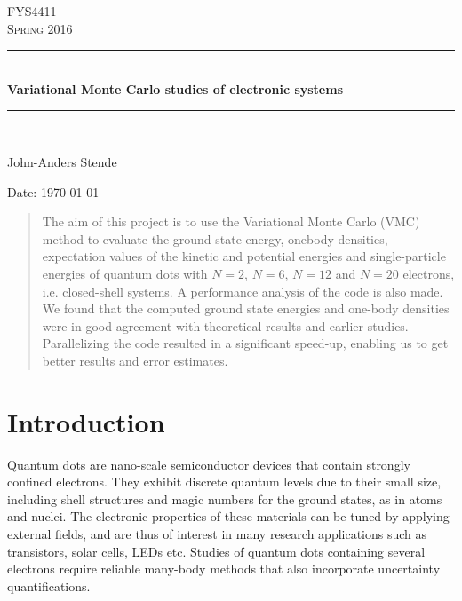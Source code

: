 \documentclass[english, a4paper]{article}
\begin{document}
\renewcommand{\figurename}{Figure}
\begin{titlepage}
\begin{center}

\textsc{\Large FYS4411}\\[0.5cm]
\textsc{\Large Spring 2016}\\[1.5cm]
\rule{\linewidth}{0.5mm} \\[0.4cm]
{ \huge \bfseries Variational Monte Carlo studies of electronic systems}\\[0.10cm]
\rule{\linewidth}{0.5mm} \\[1.5cm]

\begin{minipage}{0.49\textwidth}
    \begin{center} \large
        John-Anders Stende \\[0.8cm]
    \end{center}
\end{minipage}


\vfill

\large{Date: \today}

\end{center}
\end{titlepage}


\begin{abstract}
The aim of this project is to use the Variational Monte Carlo (VMC) method to evaluate the
ground state energy, onebody densities, expectation values of the kinetic and potential energies
and single-particle energies of quantum dots with $N=2$, $N=6$, $N=12$ and $N=20$ electrons,
i.e. closed-shell systems. A performance analysis of the code is also made. \\

\noindent
We found that the computed ground state energies and one-body densities were in good agreement 
with theoretical results
and earlier studies. Parallelizing the code resulted in a significant speed-up, enabling us to 
get better results and error estimates. 


\end{abstract}

\tableofcontents


\section{Introduction}
\noindent Quantum dots are nano-scale semiconductor devices that contain strongly confined electrons. 
They exhibit discrete quantum levels due to their small size, including shell structures and magic
numbers for the ground states, as in atoms and nuclei. The electronic properties of these materials 
can be tuned by applying external fields, and are thus of interest in many research applications such as
transistors, solar cells, LEDs etc. Studies of quantum dots containing several electrons require
reliable many-body methods that also incorporate uncertainty quantifications.\\
\end{document}
